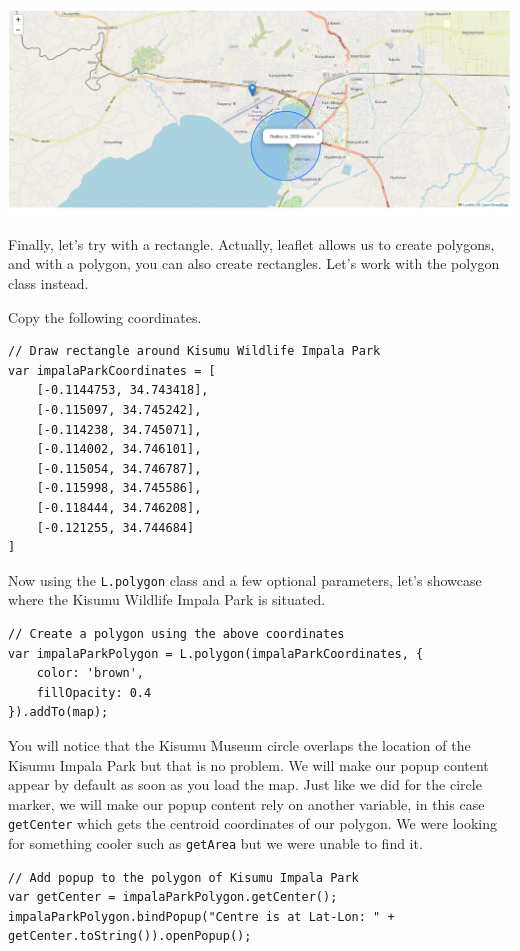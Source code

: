 \documentclass[
]{book}
\theoremstyle{definition}
\theoremstyle{definition}
\theoremstyle{definition}
\theoremstyle{definition}
\theoremstyle{remark}
\begin{document}
\includegraphics[width=26.57in]{../circle-radius}

Finally, let's try with a rectangle. Actually, leaflet allows us to create polygons, and with a polygon, you can also create rectangles. Let's work with the polygon class instead.

Copy the following coordinates.

\begin{verbatim}
// Draw rectangle around Kisumu Wildlife Impala Park
var impalaParkCoordinates = [
    [-0.1144753, 34.743418],
    [-0.115097, 34.745242],
    [-0.114238, 34.745071],
    [-0.114002, 34.746101],
    [-0.115054, 34.746787],
    [-0.115998, 34.745586],
    [-0.118444, 34.746208],
    [-0.121255, 34.744684]
]
\end{verbatim}

Now using the \texttt{L.polygon} class and a few optional parameters, let's showcase where the Kisumu Wildlife Impala Park is situated.

\begin{verbatim}
// Create a polygon using the above coordinates
var impalaParkPolygon = L.polygon(impalaParkCoordinates, {
    color: 'brown',
    fillOpacity: 0.4
}).addTo(map);
\end{verbatim}

You will notice that the Kisumu Museum circle overlaps the location of the Kisumu Impala Park but that is no problem. We will make our popup content appear by default as soon as you load the map. Just like we did for the circle marker, we will make our popup content rely on another variable, in this case \texttt{getCenter} which gets the centroid coordinates of our polygon. We were looking for something cooler such as \texttt{getArea} but we were unable to find it.

\begin{verbatim}
// Add popup to the polygon of Kisumu Impala Park
var getCenter = impalaParkPolygon.getCenter();
impalaParkPolygon.bindPopup("Centre is at Lat-Lon: " + getCenter.toString()).openPopup();
\end{verbatim}
\end{document}
